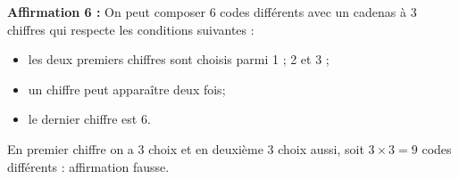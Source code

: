 \textbf{Affirmation 6 :} On peut composer 6 codes différents avec un cadenas à 3 chiffres qui respecte les conditions suivantes :

\begin{itemize}
\item[$\bullet~~$]les deux premiers chiffres sont choisis parmi 1 ; 2 et 3 ;
\item[$\bullet~~$]un chiffre peut apparaître deux fois;
\item[$\bullet~~$]le dernier chiffre est 6.
\end{itemize}

En premier chiffre on a 3 choix et en deuxième 3 choix aussi, soit $3 \times 3 = 9$ codes différents : affirmation fausse.
\bigskip

